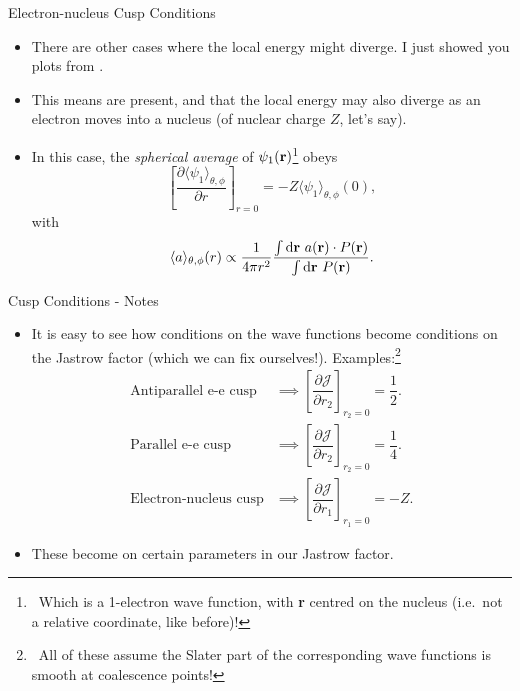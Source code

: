 \documentclass[12pt, pdf, hyperref={draft}, usenames, dvipsnames,
aspectratio=169]{beamer}
\newcommand{\dd}{\mathrm{d}}
\newcommand{\expt}[1]{\langle{#1}\rangle}
\newcommand{\red}[1]{{\bf\color{LancsRed}{#1}}}
\newcommand{\blue}[1]{{\bf\color{NavyBlue}{#1}}}
\newcommand{\green}[1]{{\bf\color{ForestGreen}{#1}}}
\begin{document}
\begin{frame}{Electron-nucleus Cusp Conditions}
\begin{itemize}
  \item There are other cases where the local energy might diverge. I just
  showed you plots from \blue{an all-electron calculation}.
  \item This means \red{bare nuclei} are present, and that the local energy may
  also diverge as an electron moves into a nucleus (of nuclear charge $Z$,
  let's say).
  \item In this case, the \textit{spherical average} of $\psi_1({\bf
  r})$\footnote{\ Which is a 1-electron wave function, with {\bf r} centred
  on the nucleus (i.e.\ not a relative coordinate, like before)!} obeys
  \begin{equation}
    {\left[ \dfrac{\partial \expt{\psi_1}_{\theta,\phi}}{\partial r}
    \right]}_{r=0} = -Z \expt{\psi_1}_{\theta,\phi}(0),
  \end{equation}
  with
  \begin{equation}
    \expt{a}_{\theta,\phi}(r) \propto \dfrac{1}{4\pi r^2}
    \dfrac{\int\dd{\bf r}\ a({\bf r})\cdot P({\bf r})}{\int\dd{\bf r}\ P({\bf
    r})}.
  \end{equation}
\end{itemize}
\end{frame}


\begin{frame}{Cusp Conditions - Notes}

\begin{itemize}
  \item It is easy to see how conditions on the wave functions become
  conditions on the Jastrow factor (which we can fix ourselves!).
  Examples:\footnote{\ All of these assume the Slater part of the corresponding
  wave functions is smooth at coalescence points!}
  \begin{align}
    \text{Antiparallel e-e cusp} &\implies {\left[\dfrac{\partial \mathcal{J}}{\partial r_2}\right]}_{r_2=0} =
    \dfrac{1}{2}. \\
    \text{Parallel e-e cusp} &\implies {\left[\dfrac{\partial \mathcal{J}}{\partial r_2}\right]}_{r_2=0} =
    \dfrac{1}{4}. \\
    \text{Electron-nucleus cusp} &\implies {\left[ \dfrac{\partial \mathcal{J}}{\partial r_1}
    \right]}_{r_1=0}
    = -Z.
  \end{align}
  \item These become \green{trivial constraints} on certain parameters in our
  Jastrow factor.
\end{itemize}
\end{frame}
\end{document}
